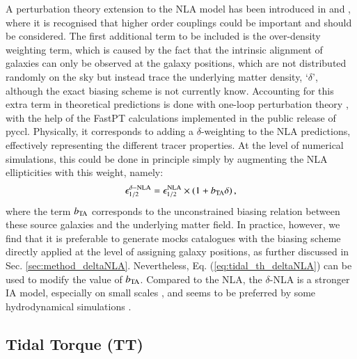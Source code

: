 \documentclass[useAMS,usenatbib]{mn2e}
\begin{document}
A perturbation theory extension to the NLA model has been introduced in \citet{Blazek2015} and  \citet{Blazek2019},  where it is recognised that higher order couplings could be important and should be considered. The first additional term to be included is the over-density weighting term, which is caused by the fact that the intrinsic alignment of galaxies can only be observed at the galaxy positions, which are not distributed randomly on the sky but instead trace the underlying matter density,  `$\delta$', although the exact biasing scheme is not currently know. Accounting for this extra term in theoretical predictions is done with one-loop perturbation theory  \citep{Blazek2019}, with the help of the {\sc FastPT} calculations  \citep{FastPT} implemented in the public release of {\sc pyccl}. Physically, it corresponds to adding a $\delta$-weighting to the NLA predictions, effectively representing the different tracer properties. At the level of numerical simulations, this could be done in principle simply by augmenting the NLA ellipticities with this weight, namely:
 \begin{eqnarray}
\epsilon_{1/2}^{\delta-\rm NLA} = \epsilon_{1/2}^{\rm NLA}\times(1 + b_{\rm TA}\delta) \, ,
\label{eq:tidal_th_deltaNLA}
\end{eqnarray}
where the term $b_{\rm TA}$ corresponds to the unconstrained biasing relation between these source galaxies and the underlying matter field. In practice, however, we find that it is preferable to generate mocks catalogues with the biasing scheme directly applied at the level of assigning galaxy positions, as further discussed in Sec. \ref{sec:method_deltaNLA}. Nevertheless, Eq. (\ref{eq:tidal_th_deltaNLA}) can be used to modify the value of $b_{\rm TA}$.  
Compared to the NLA, the $\delta$-NLA is a stronger IA model, especially on small scales \citep{Blazek2019}, and seems to be preferred by some hydrodynamical simulations \citep{Hilbert_IA2017}.


\subsection{Tidal Torque (TT)}
\label{subsec:IA_th_TT}
\end{document}
